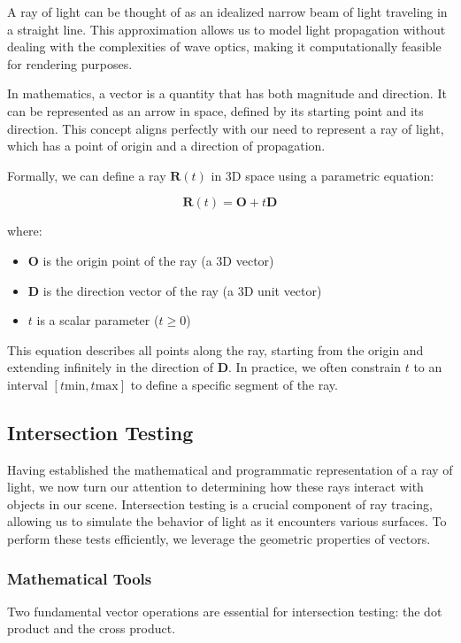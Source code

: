 \documentclass[12pt]{article}
\begin{document}
A ray of light can be thought of as an idealized narrow beam of light traveling in a straight line. This approximation allows us to model light propagation without dealing with the complexities of wave optics, making it computationally feasible for rendering purposes.

In mathematics, a vector is a quantity that has both magnitude and direction. It can be represented as an arrow in space, defined by its starting point and its direction. This concept aligns perfectly with our need to represent a ray of light, which has a point of origin and a direction of propagation.

Formally, we can define a ray \(\mathbf{R}(t)\) in 3D space using a parametric equation:

\[
    \mathbf{R}(t) = \mathbf{O} + t\mathbf{D}
\]

where:
\begin{itemize}
    \item \(\mathbf{O}\) is the origin point of the ray (a 3D vector)
    \item \(\mathbf{D}\) is the direction vector of the ray (a 3D unit vector)
    \item \(t\) is a scalar parameter (\(t \geq 0\))
\end{itemize}

This equation describes all points along the ray, starting from the origin and extending infinitely in the direction of \(\mathbf{D}\). In practice, we often constrain \(t\) to an interval \([t{\text{min}}, t{\text{max}}]\) to define a specific segment of the ray.

\subsection{Intersection Testing}

Having established the mathematical and programmatic representation of a ray of light, we now turn our attention to determining how these rays interact with objects in our scene. Intersection testing is a crucial component of ray tracing, allowing us to simulate the behavior of light as it encounters various surfaces. To perform these tests efficiently, we leverage the geometric properties of vectors.

\subsubsection{Mathematical Tools}

Two fundamental vector operations are essential for intersection testing: the dot product and the cross product.
\end{document}
